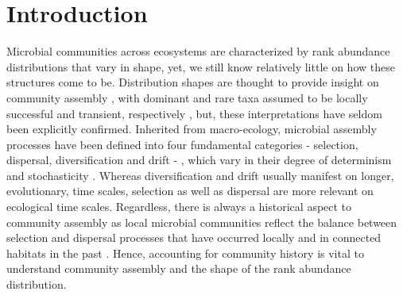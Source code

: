 \documentclass[12pt,a4paper]{article} %
\begin{document}
\section*{Introduction}
Microbial communities across ecosystems are characterized by rank abundance distributions that vary in shape, yet, we still know relatively little on how these structures come to be. Distribution shapes are thought to provide insight on community assembly \citep{McGill2007}, with dominant and rare taxa assumed to be locally successful and transient, respectively \citep{Magurran2003, Nakadai2020}, but, these interpretations have seldom been explicitly confirmed. Inherited from macro-ecology, microbial assembly processes have been defined into four fundamental categories - selection, dispersal, diversification and drift - \citep{Vellend2010}, which vary in their degree of determinism and stochasticity \citep{Zhou2017}. Whereas diversification and drift usually manifest on longer, evolutionary, time scales, selection as well as dispersal are more relevant on ecological time scales. Regardless, there is always a historical aspect to community assembly as local microbial communities reflect the balance between selection and dispersal processes that have occurred locally and in connected habitats in the past \citep{Fukami2004}. Hence, accounting for community history is vital to understand community assembly and the shape of the rank abundance distribution.
\end{document}
